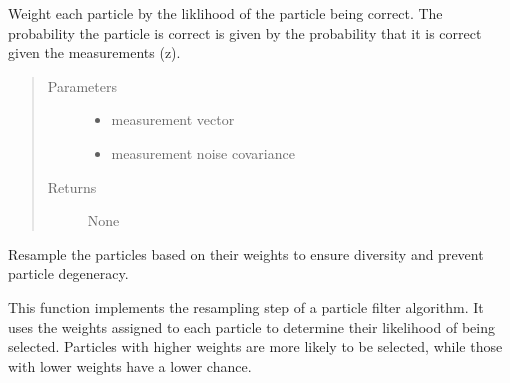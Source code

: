 \documentclass[letterpaper,10pt,english]{sphinxmanual}
\begin{document}
\begin{fulllineitems}
\begin{fulllineitems}
\begin{quote}
\begin{description}
\end{description}\end{quote}

\end{fulllineitems}


\begin{fulllineitems}
\label{\detokenize{particle_filter:ParticleFilter.ParticleFilter.Weight}}
\sphinxAtStartPar
Weight each particle by the liklihood of the particle being correct.
The probability the particle is correct is given by the probability that it is correct given the measurements (z).
\begin{quote}\begin{description}
\item[{Parameters}] \leavevmode\begin{itemize}
\item {} 
\sphinxAtStartPar
{} \textendash{} measurement vector

\item {} 
\sphinxAtStartPar
{} \textendash{} measurement noise covariance

\end{itemize}

\item[{Returns}] \leavevmode
\sphinxAtStartPar
None

\end{description}\end{quote}

\end{fulllineitems}


\begin{fulllineitems}
\label{\detokenize{particle_filter:ParticleFilter.ParticleFilter.Resample}}
\sphinxAtStartPar
Resample the particles based on their weights to ensure diversity and prevent particle degeneracy.

\sphinxAtStartPar
This function implements the resampling step of a particle filter algorithm. It uses the weights
assigned to each particle to determine their likelihood of being selected. Particles with higher weights
are more likely to be selected, while those with lower weights have a lower chance.


\end{fulllineitems}
\end{fulllineitems}
\end{document}
